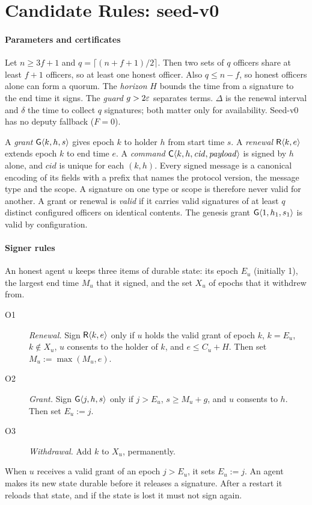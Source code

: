 \section{Candidate Rules: \sys{} seed-v0}
\label{sec:rules}

\paragraph{Parameters and certificates}
Let $n \ge 3f + 1$ and $q = \lceil (n + f + 1)/2 \rceil$. Then two sets of $q$ officers
share at least $f + 1$ officers, so at least one honest officer. Also $q \le n - f$, so
honest officers alone can form a quorum. The \emph{horizon} $H$ bounds the time from a
signature to the end time it signs. The \emph{guard} $g > 2\varepsilon$ separates terms. $\Delta$
is the renewal interval and $\delta$ the time to collect $q$ signatures; both matter only
for availability. Seed-v0 has no deputy fallback ($F = 0$).

A \emph{grant} $\mathsf{G}\langle k, h, s\rangle$ gives epoch $k$ to holder $h$ from start time $s$. A
\emph{renewal} $\mathsf{R}\langle k, e\rangle$ extends epoch $k$ to end time $e$. A \emph{command}
$\mathsf{C}\langle k, h, \mathit{cid}, \mathit{payload}\rangle$ is signed by $h$ alone, and $\mathit{cid}$ is
unique for each $(k, h)$. Every signed message is a canonical encoding of its fields with
a prefix that names the protocol version, the message type and the scope. A signature on
one type or scope is therefore never valid for another. A grant or renewal is
\emph{valid} if it carries valid signatures of at least $q$ distinct configured officers
on identical contents. The genesis grant $\mathsf{G}\langle 1, h_1, s_1\rangle$ is valid by configuration.

\paragraph{Signer rules}
An honest agent $u$ keeps three items of durable state: its epoch $E_u$ (initially 1),
the largest end time $M_u$ that it signed, and the set $X_u$ of epochs that it withdrew
from.
\begin{description}
  \item[O1] \emph{Renewal.} Sign $\mathsf{R}\langle k, e\rangle$ only if $u$ holds the valid grant of epoch $k$,
  $k = E_u$, $k \notin X_u$, $u$ consents to the holder of $k$, and $e \le C_u + H$. Then
  set $M_u := \max(M_u, e)$.
  \item[O2] \emph{Grant.} Sign $\mathsf{G}\langle j, h, s\rangle$ only if $j > E_u$, $s \ge M_u + g$, and $u$
  consents to $h$. Then set $E_u := j$.
  \item[O3] \emph{Withdrawal.} Add $k$ to $X_u$, permanently.
\end{description}
When $u$ receives a valid grant of an epoch $j > E_u$, it sets $E_u := j$. An agent makes
its new state durable before it releases a signature. After a restart it reloads that
state, and if the state is lost it must not sign again.

